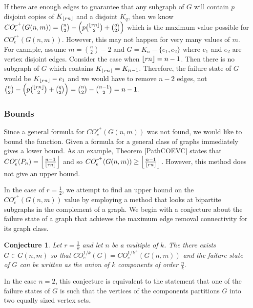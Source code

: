 \documentclass[12pt]{article}
\DeclarePairedDelimiter{\ceil}{\lceil}{\rceil}
\DeclarePairedDelimiter{\floor}{\lfloor}{\rfloor}
\newtheorem{conjecture}[theorem]{Conjecture}
\theoremstyle{definition}
\newcommand{\COE}[2]{CO^{#1}_{e}(#2)}
\newcommand{\COEMAX}[1]{CO^{r^+}_{e}(#1)}
\begin{document}
If there are enough edges to guarantee that any subgraph of $G$ will contain $p$ disjoint copies of $K_{\floor{rn}}$ and a disjoint $K_q$, then we know $\COEMAX{G(n,m)} ={n \choose 2} - \left(p {\floor{rn} \choose 2} + {q \choose 2}\right)$ which is the maximum value possible for $\COEMAX{G(n,m)}.$ However, this may not happen for very many values of $m$. For example, assume $m = {n \choose 2} - 2$ and $G = K_{n} - \{e_1, e_2\}$ where $e_1$ and $e_2$ are vertex disjoint edges. Consider the case when $\floor{rn} = n-1$. Then there is no subgraph of $G$ which contains $K_{\floor{rn}}= K_{n-1}$. Therefore, the failure state of $G$ would be $K_{\floor{rn}} - e_1$ and we would have to remove $n-2$ edges, not ${n \choose 2} - \left(p {\floor{rn} \choose 2} + {q \choose 2}\right)= {n \choose 2} - {n-1 \choose 2} = n-1.$




\subsubsection{Bounds}

Since a general formula for $\COEMAX{G(n,m)}$ was not found, we would like to bound the function. Given a formula for a general class of graphs immediately gives a lower bound. As an example, Theorem \ref{PathCOEVC} states that $\COE{r}{P_n}=\left\lfloor\frac{n-1}{\floor{rn}}\right\rfloor$ and so $\COEMAX{G(n,m)}\ge \left\lfloor\frac{n-1}{\floor{rn}}\right\rfloor$. However, this method does not give an upper bound.

In the case of $r=\frac{1}{2}$, we attempt to find an upper bound on the $\COEMAX{G(n,m)}$ value by employing a method that looks at bipartite subgraphs in the complement of a graph. We begin with a conjecture about the failure state of a graph that achieves the maximum edge removal connectivity for its graph class.

\begin{conjecture}\label{componentconjecture}
Let $r=\frac{1}{k}$ and let $n$ be a multiple of $k$. The there exists $G\in G(n,m)$ so that $\COE{1/k}{G}=\COE{1/k^+}{G(n,m)}$ and the failure state of $G$ can be written as the union of $k$ components of order $\frac{n}{k}$.
\end{conjecture}

In the case $n=2$, this conjecture is equivalent to the statement that one of the failure states of $G$ is such that the vertices of the components partitions $G$ into two equally sized vertex sets.\\
\end{document}
